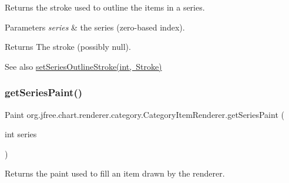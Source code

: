 Returns the stroke used to outline the items in a series.


\begin{DoxyParams}{Parameters}
{\em series} & the series (zero-\/based index).\\
\hline
\end{DoxyParams}
\begin{DoxyReturn}{Returns}
The stroke (possibly {\ttfamily null}).
\end{DoxyReturn}
\begin{DoxySeeAlso}{See also}
\mbox{\hyperlink{interfaceorg_1_1jfree_1_1chart_1_1renderer_1_1category_1_1_category_item_renderer_a07b423a5d7e9af0bd6a5a68b3ac5cd3f}{set\+Series\+Outline\+Stroke(int, Stroke)}} 
\end{DoxySeeAlso}
\mbox{\label{interfaceorg_1_1jfree_1_1chart_1_1renderer_1_1category_1_1_category_item_renderer_a43c98426743800cd392cc9e19b865c67}} 
\subsubsection{\texorpdfstring{get\+Series\+Paint()}{getSeriesPaint()}}
{\footnotesize\ttfamily Paint org.\+jfree.\+chart.\+renderer.\+category.\+Category\+Item\+Renderer.\+get\+Series\+Paint (\begin{DoxyParamCaption}\item[{int}]{series }\end{DoxyParamCaption})}

Returns the paint used to fill an item drawn by the renderer.


